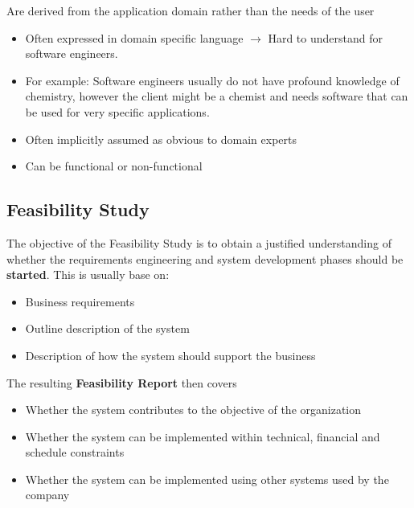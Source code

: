 \documentclass[
../../Software_Engineering_Summary.tex,
]
{subfiles}
\begin{document}
\begin{greenbox*}
    Are derived from the application domain rather than the needs of the user
    \begin{itemize}
        \item Often expressed in domain specific language $\rightarrow$ Hard to understand for software engineers. 
        \item For example: Software engineers usually do not have profound knowledge of chemistry, however the client might be a chemist and needs software that can be used for very specific applications. 
        \item Often implicitly assumed as obvious to domain experts
        \item Can be functional or non-functional
    \end{itemize}
\end{greenbox*}

\subsection{Feasibility Study}
The objective of the Feasibility Study is to obtain a justified understanding of whether the requirements engineering and system development phases should be \textbf{started}. This is usually base on:

\begin{greenbox*}
    \begin{itemize}
        \item Business requirements 
        \item Outline description of the system
        \item Description of how the system should support the business
    \end{itemize}
\end{greenbox*}

The resulting \textbf{Feasibility Report} then covers

\begin{greenbox*}
    \begin{itemize}
        \item Whether the system contributes to the objective of the organization
        \item Whether the system can be implemented within technical, financial and schedule constraints
        \item Whether the system can be implemented using other systems used by the company
    \end{itemize}
\end{greenbox*}
\end{document}
